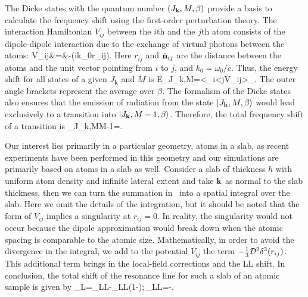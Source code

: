 The Dicke states with the quantum number $(J_{\bf k},M,\beta)$ provide a basis to calculate the frequency shift using the first-order perturbation theory. The interaction Hamiltonian $V_{ij}$ between the $i$th and the $j$th atom consists of the dipole-dipole interaction due to the exchange of virtual photons between the atoms:
\bea
V_{ij}&=&-\exp(ik_0r_{ij}).
\eea
Here $r_{ij}$ and $\hat{\bf n}_{ij}$ are the distance between the atoms and the unit vector pointing from $i$ to $j$, and $k_0 = \omega_0/c$.
Thus, the energy shift for all states of a given $J_\mathbf k$ and $M$ is
\bea
\Delta E_{J_\mathbf k,M}=\left<\sum_{i<j}V_{ij}\right>_\beta.
\label{E_SHIFT}
\eea
The outer angle brackets represent the average over $\beta$.
The formalism of the Dicke states also ensures that the emission of radiation from the state $\left| J_{\mathbf k},M,\beta \right\rangle$ would lead exclusively to a transition into $\left| J_{\mathbf k},M-1,\beta \right\rangle$. Therefore, the total frequency shift of a transition is
\bea
\Delta\Omega_{J_\mathbf k,M\to M-1}=.
\eea

Our interest lies primarily in a particular geometry, atoms in a slab, as recent experiments have been performed in this geometry and our simulations are primarily based on atoms in a slab as well. Consider a slab of thickness $h$ with uniform  atom density and infinite lateral extent and take $\bf k$ as normal to the slab thickness, then we can turn the summation in~ into a spatial integral over the slab. Here we omit the details of the integration, but it should be noted that the form of $V_{ij}$ implies a singularity at $r_{ij}=0$. In reality, the singularity would not occur because the dipole approximation would break down when the atomic spacing is comparable to the atomic size. Mathematically, in order to avoid the divergence in the integral, we  add to the potential $V_{ij}$ the term $-\frac{1}{3}\dip^2\delta^3(r_{ij})$. This additional term brings in the local-field corrections and the LL shift.
In conclusion, the total shift of the resonance line for such a slab of an atomic sample is given by
\bea
\Delta_L=\Delta_{LL}-\Delta_{LL}\left(1-\right);\,\quad\Delta_{LL}=-.
\label{CLS_1}
\eea


